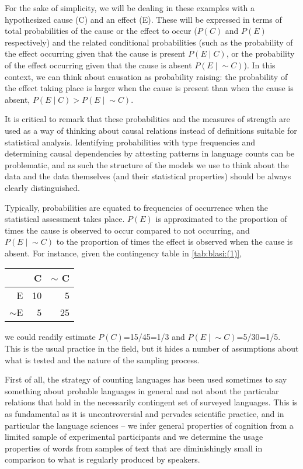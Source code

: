 \documentclass[output=paper]{langsci/langscibook}
\begin{document}
For the sake of simplicity, we will be dealing in these examples with a hypothesized cause (C) and an effect (E). These will be expressed in terms of total probabilities of the cause or the effect to occur ($P(C)$ and $P(E)$ respectively) and the related conditional probabilities (such as the probability of the effect occurring given that the cause is present $P(E {\mid}  C)$, or the probability of the effect occurring given that the cause is absent $P(E{\mid}{}{\sim}C)$).  In this context, we can think about causation as probability raising: the probability of the effect taking place is larger when the cause is present than when the cause is absent, $P(E{\mid}{}C) > P(E{\mid}{}{\sim}C)$. 

It is critical to remark that these probabilities and the measures of strength are used as a way of thinking about causal relations instead of definitions suitable for statistical analysis. Identifying probabilities with type frequencies and determining causal dependencies by attesting patterns in language counts can be problematic, and as such the structure of the models we use to think about the data and the data themselves (and their statistical properties) should be always clearly distinguished.
 
Typically, probabilities are equated to frequencies of occurrence when the statistical assessment takes place. $P(E)$ is approximated to the proportion of times the cause is observed to occur compared to not occurring, and $P(E{\mid}{}{\sim}C)$ to the proportion of times the effect is observed when the cause is absent. For instance, given the contingency table in \ref{tab:blasi:(1)},
 

\ea \label{tab:blasi:(1)}
\begin{tabular}{rrr}
 & C & $\sim$ C \\
 \midrule
E & 10 & 5 \\
${\sim}$E & 5 & 25 \\
\end{tabular}
\z

\newpage 
\noindent
we could readily estimate $P(C)$=15/45=1/3 and $P(E{\mid}{}{\sim}C)$=5/30=1/5. This is the usual practice in the field, but it hides a number of assumptions about what is tested and the nature of the sampling process.

First of all, the strategy of counting languages has been used sometimes to say something about probable languages in general and not about the particular relations that hold in the necessarily contingent set of surveyed languages. This is as fundamental as it is uncontroversial and pervades scientific practice, and in particular the language sciences -- we infer general properties of cognition  from a limited sample of experimental participants and we determine the usage properties  of words from samples of text that are diminishingly small in comparison to what is regularly produced by speakers. 
\end{document}
